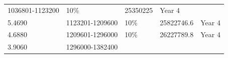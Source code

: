 \documentclass[11pt,a4paperpaper,]{report}
\begin{document}
\begin{longtable}[]{@{}llllc@{}}
\begin{minipage}[t]{0.23\columnwidth}
1036801-1123200\strut
\end{minipage} & \begin{minipage}[t]{0.14\columnwidth}\raggedright\strut
10\%\strut
\end{minipage} & \begin{minipage}[t]{0.19\columnwidth}\raggedright\strut
25350225\strut
\end{minipage} & \begin{minipage}[t]{0.16\columnwidth}\centering\strut
Year 4\strut
\end{minipage}\tabularnewline
\begin{minipage}[t]{0.12\columnwidth}\raggedright\strut
5.4690\strut
\end{minipage} & \begin{minipage}[t]{0.23\columnwidth}\raggedright\strut
1123201-1209600\strut
\end{minipage} & \begin{minipage}[t]{0.14\columnwidth}\raggedright\strut
10\%\strut
\end{minipage} & \begin{minipage}[t]{0.19\columnwidth}\raggedright\strut
25822746.6\strut
\end{minipage} & \begin{minipage}[t]{0.16\columnwidth}\centering\strut
Year 4\strut
\end{minipage}\tabularnewline
\begin{minipage}[t]{0.12\columnwidth}\raggedright\strut
4.6880\strut
\end{minipage} & \begin{minipage}[t]{0.23\columnwidth}\raggedright\strut
1209601-1296000\strut
\end{minipage} & \begin{minipage}[t]{0.14\columnwidth}\raggedright\strut
10\%\strut
\end{minipage} & \begin{minipage}[t]{0.19\columnwidth}\raggedright\strut
26227789.8\strut
\end{minipage} & \begin{minipage}[t]{0.16\columnwidth}\centering\strut
Year 4\strut
\end{minipage}\tabularnewline
\begin{minipage}[t]{0.12\columnwidth}\raggedright\strut
3.9060\strut
\end{minipage} & \begin{minipage}[t]{0.23\columnwidth}\raggedright\strut
1296000-1382400\strut
\end{minipage} & \begin{minipage}[t]{0.14\columnwidth}\raggedright\strut

\end{minipage}
\end{longtable}
\end{document}
